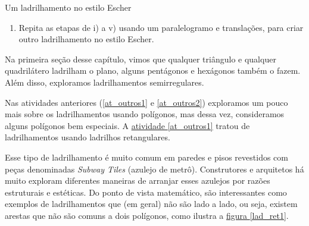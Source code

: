 {\begin{task}{Um ladrilhamento no estilo Escher}
\begin{enumerate}
\begin{enumerate}
	\begin{figure}[H]
	\centering
	\texttt{[image: ladrilhamento43]}
	\caption{Instruções para realizar o ladrilhamento.}
	\label{escher2}
	\end{figure}

	\item Para ladrilhar o plano, utilizando o lápis, faça um traço ao redor do ladrilho. Em seguida, gire e desenhe o ladrilho repetidamente até que se tenha o design pretendido.
	\item Adicione cores e desenhos ao ladrilho para que pareça uma obra de arte, como ilustra a \hyperref[escher3]{figura \ref{escher3}}.

	\begin{figure}[H]
	\centering
	\texttt{[image: ladrilhamento44]}
	\caption{Ladrilhamento parcial.}
	\label{escher3}
	\end{figure}
\end{enumerate}

	\item Repita as etapas de i) a v) usando um paralelogramo e translações, para criar outro ladrilhamento no estilo Escher.

\end{enumerate}
\end{task}



\clearpage
{}


Na primeira seção desse capítulo, vimos que qualquer triângulo e qualquer quadrilátero ladrilham o plano, alguns pentágonos e hexágonos também o fazem. Além disso, exploramos ladrilhamentos semirregulares. 

Nas atividades anteriores (\ref{at_outros1} e \ref{at_outros2}) exploramos um pouco mais sobre os ladrilhamentos usando polígonos, mas dessa vez, consideramos alguns polígonos bem especiais. A \hyperref[at_outros1]{atividade \ref{at_outros1}} tratou de ladrilhamentos usando ladrilhos retangulares.

Esse tipo de ladrilhamento é muito comum em  paredes e pisos revestidos com peças denominadas \textit{Subway Tiles }(azulejo de metrô). Construtores e arquitetos  há muito exploram diferentes maneiras de arranjar esses azulejos por razões estruturais e estéticas. Do ponto de vista  matemático, são interessantes como exemplos de ladrilhamentos que (em geral) não são  lado a lado, ou seja, existem arestas que não são comuns a dois polígonos, como ilustra a \hyperref[lad_ret1]{figura \ref{lad_ret1}}.

}
